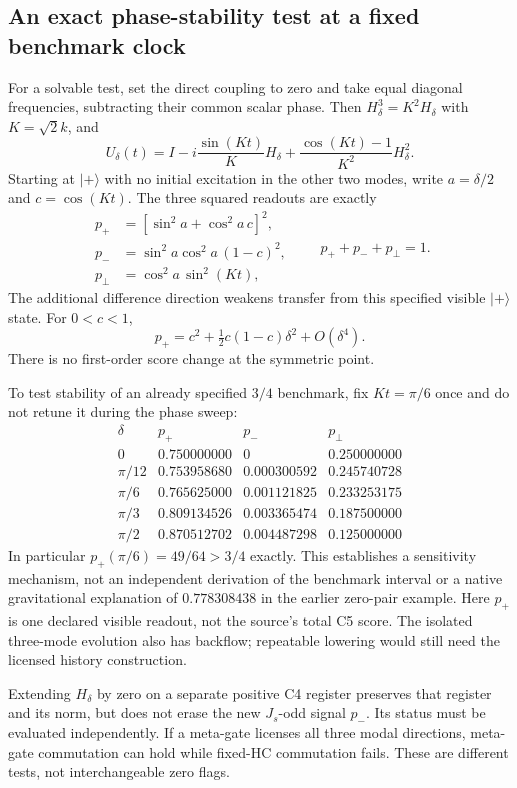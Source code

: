 \documentclass[11pt,a4paper]{article}
\begin{document}
\subsection{An exact phase-stability test at a fixed benchmark clock}
For a solvable test, set the direct coupling to zero and take equal
diagonal frequencies, subtracting their common scalar phase.
Then $H_\delta^3=K^2H_\delta$ with $K=\sqrt2 k$, and
\[
 U_\delta(t)=I-i\frac{\sin(Kt)}K H_\delta
 +\frac{\cos(Kt)-1}{K^2}H_\delta^2.
\]
Starting at $|+\rangle$ with no initial excitation in the other
two modes, write $a=\delta/2$ and $c=\cos(Kt)$. The three squared
readouts are exactly
\[
 \begin{aligned}
 p_+&=[\sin^2a+\cos^2a\,c]^2,\\
 p_-&=\sin^2a\cos^2a\,(1-c)^2,\\
 p_\perp&=\cos^2a\,\sin^2(Kt),
 \end{aligned}\qquad p_++p_-+p_\perp=1.
\]
The additional difference direction weakens transfer from this
specified visible $|+\rangle$ state. For $0<c<1$,
\[
 p_+=c^2+\tfrac12c(1-c)\delta^2+O(\delta^4).
\]
There is no first-order score change at the symmetric point.

To test stability of an already specified $3/4$ benchmark, fix
$Kt=\pi/6$ once and do not retune it during the phase sweep:
\[
\begin{array}{c|c|c|c}
\delta&p_+&p_-&p_\perp\\
\hline
0&0.750000000&0&0.250000000\\
\pi/12&0.753958680&0.000300592&0.245740728\\
\pi/6&0.765625000&0.001121825&0.233253175\\
\pi/3&0.809134526&0.003365474&0.187500000\\
\pi/2&0.870512702&0.004487298&0.125000000
\end{array}
\]
In particular $p_+(\pi/6)=49/64>3/4$ exactly. This establishes
a sensitivity mechanism, not an independent derivation of the
benchmark interval or a native gravitational explanation of
$0.778308438$ in the earlier zero-pair example. Here $p_+$ is
one declared visible readout, not the source's total C5 score.
The isolated three-mode evolution also has backflow; repeatable
lowering would still need the licensed history construction.

Extending $H_\delta$ by zero on a separate positive C4 register
preserves that register and its norm, but does not erase the new
$J_s$-odd signal $p_-$. Its status must be evaluated independently.
If a meta-gate licenses all three modal directions, meta-gate
commutation can hold while fixed-HC commutation fails. These are
different tests, not interchangeable zero flags.
\end{document}

